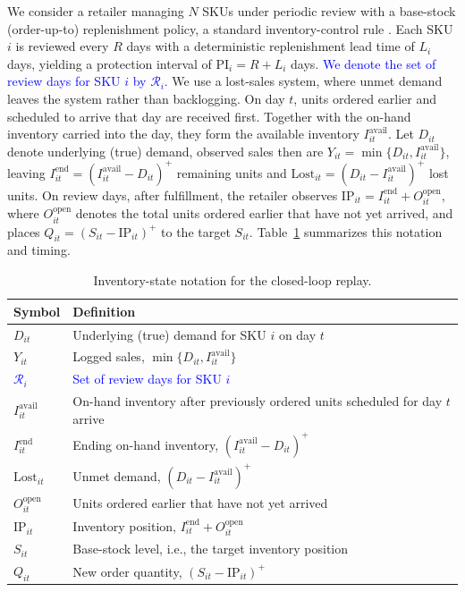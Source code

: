 \documentclass[msom,dblanonrev]{informs4}
\newcommand{\add}[1]{\textcolor{blue}{#1}}
\begin{document}
We consider a retailer managing $N$ SKUs under periodic review with a base-stock (order-up-to) replenishment policy, a standard inventory-control rule \citep{Porteus2002}.
Each SKU $i$ is reviewed every $R$ days with a deterministic replenishment lead time of $L_i$ days, yielding a protection interval of $\text{PI}_i = R + L_i$ days.
\add{We denote the set of review days for SKU $i$ by $\mathcal R_i$.}
We use a lost-sales system, where unmet demand leaves the system rather than backlogging. On day $t$, units ordered earlier and scheduled to arrive that day are received first. Together with the on-hand inventory carried into the day, they form the available inventory $I^{\mathrm{avail}}_{it}$. Let $D_{it}$ denote underlying (true) demand, observed sales then are $Y_{it}=\min\{D_{it},I^{\mathrm{avail}}_{it}\}$, leaving $I^{\mathrm{end}}_{it}=(I^{\mathrm{avail}}_{it}-D_{it})^+$ remaining units and $\mathrm{Lost}_{it}=(D_{it}-I^{\mathrm{avail}}_{it})^+$ lost units. On review days, after fulfillment, the retailer observes $\mathrm{IP}_{it}=I^{\mathrm{end}}_{it}+O^{\mathrm{open}}_{it}$, where $O^{\mathrm{open}}_{it}$ denotes the total units ordered earlier that have not yet arrived, and places $Q_{it}=(S_{it}-\mathrm{IP}_{it})^+$ to the target $S_{it}$. Table~\ref{tab:inventory-state-notation} summarizes this notation and timing.

\begin{table}[ht]
\caption{Inventory-state notation for the closed-loop replay.}\label{tab:inventory-state-notation}
\centering\small
%
\begin{tabular}{@{}>{\raggedright\arraybackslash}p{}>{\raggedright\arraybackslash}p{}@{}}
\toprule
\textbf{Symbol} & \textbf{Definition} \\
\midrule
$D_{it}$ & Underlying (true) demand for SKU $i$ on day $t$ \\
$Y_{it}$ & Logged sales, $\min\{D_{it},I^{\mathrm{avail}}_{it}\}$ \\
\add{$\mathcal R_i$} & \add{Set of review days for SKU $i$} \\
$I^{\mathrm{avail}}_{it}$ & On-hand inventory after previously ordered units scheduled for day $t$ arrive \\
$I^{\mathrm{end}}_{it}$ & Ending on-hand inventory, $(I^{\mathrm{avail}}_{it}-D_{it})^+$ \\
$\mathrm{Lost}_{it}$ & Unmet demand, $(D_{it}-I^{\mathrm{avail}}_{it})^+$ \\
$O^{\mathrm{open}}_{it}$ & Units ordered earlier that have not yet arrived \\
$\mathrm{IP}_{it}$ & Inventory position, $I^{\mathrm{end}}_{it}+O^{\mathrm{open}}_{it}$ \\
$S_{it}$ & Base-stock level, i.e., the target inventory position \\
$Q_{it}$ & New order quantity, $(S_{it}-\mathrm{IP}_{it})^+$ \\
\bottomrule
\end{tabular}
\end{table}
\end{document}
